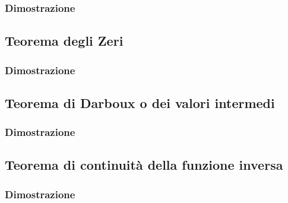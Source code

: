 \documentclass[11pt, a4paper]{article}
\begin{document}
\subsubsection*{Dimostrazione}


\subsection{Teorema degli Zeri}
\subsubsection*{Dimostrazione}


\subsection{Teorema di Darboux o dei valori intermedi}
\subsubsection*{Dimostrazione}


\subsection{Teorema di continuità della funzione inversa}
\subsubsection*{Dimostrazione}
\end{document}
